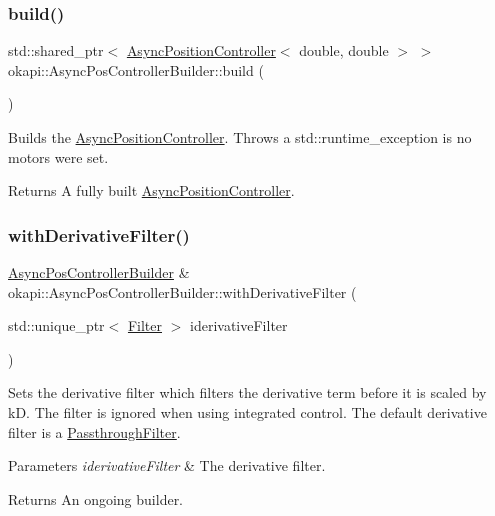 \subsubsection{\texorpdfstring{build()}{build()}}
{\footnotesize\ttfamily std\+::shared\+\_\+ptr$<$ \mbox{\hyperlink{classokapi_1_1AsyncPositionController}{Async\+Position\+Controller}}$<$ double, double $>$ $>$ okapi\+::\+Async\+Pos\+Controller\+Builder\+::build (\begin{DoxyParamCaption}{ }\end{DoxyParamCaption})}

Builds the \mbox{\hyperlink{classokapi_1_1AsyncPositionController}{Async\+Position\+Controller}}. Throws a std\+::runtime\+\_\+exception is no motors were set.

\begin{DoxyReturn}{Returns}
A fully built \mbox{\hyperlink{classokapi_1_1AsyncPositionController}{Async\+Position\+Controller}}. 
\end{DoxyReturn}
\mbox{\label{classokapi_1_1AsyncPosControllerBuilder_a6d1bda12787e919e9b52d06703824fd1}} 
\subsubsection{\texorpdfstring{withDerivativeFilter()}{withDerivativeFilter()}}
{\footnotesize\ttfamily \mbox{\hyperlink{classokapi_1_1AsyncPosControllerBuilder}{Async\+Pos\+Controller\+Builder}} \& okapi\+::\+Async\+Pos\+Controller\+Builder\+::with\+Derivative\+Filter (\begin{DoxyParamCaption}\item[{std\+::unique\+\_\+ptr$<$ \mbox{\hyperlink{classokapi_1_1Filter}{Filter}} $>$}]{iderivative\+Filter }\end{DoxyParamCaption})}

Sets the derivative filter which filters the derivative term before it is scaled by kD. The filter is ignored when using integrated control. The default derivative filter is a \mbox{\hyperlink{classokapi_1_1PassthroughFilter}{Passthrough\+Filter}}.


\begin{DoxyParams}{Parameters}
{\em iderivative\+Filter} & The derivative filter. \\
\hline
\end{DoxyParams}
\begin{DoxyReturn}{Returns}
An ongoing builder. 
\end{DoxyReturn}
\mbox{\label{classokapi_1_1AsyncPosControllerBuilder_a4ac4afe101f6e49150d5f285ccd02e50}} 
